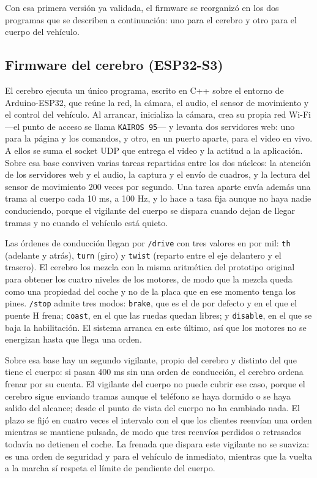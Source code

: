 \documentclass[journal]{IEEEtran}
\begin{document}
Con esa primera versión ya validada, el firmware se reorganizó en los dos programas que se describen a continuación: uno para el cerebro y otro para el cuerpo del vehículo.

\subsection{Firmware del cerebro (ESP32-S3)}
El cerebro ejecuta un único programa, escrito en C++ sobre el entorno de Arduino-ESP32, que reúne la red, la cámara, el audio, el sensor de movimiento y el control del vehículo. Al arrancar, inicializa la cámara, crea su propia red Wi-Fi ---el punto de acceso se llama \texttt{KAIROS 95}--- y levanta dos servidores web: uno para la página y los comandos, y otro, en un puerto aparte, para el video en vivo. A ellos se suma el socket UDP que entrega el video y la actitud a la aplicación. Sobre esa base conviven varias tareas repartidas entre los dos núcleos: la atención de los servidores web y el audio, la captura y el envío de cuadros, y la lectura del sensor de movimiento 200 veces por segundo. Una tarea aparte envía además una trama al cuerpo cada 10 ms, a 100 Hz, y lo hace a tasa fija aunque no haya nadie conduciendo, porque el vigilante del cuerpo se dispara cuando dejan de llegar tramas y no cuando el vehículo está quieto.

Las órdenes de conducción llegan por \texttt{/drive} con tres valores en por mil: \texttt{th} (adelante y atrás), \texttt{turn} (giro) y \texttt{twist} (reparto entre el eje delantero y el trasero). El cerebro los mezcla con la misma aritmética del prototipo original para obtener los cuatro niveles de los motores, de modo que la mezcla queda como una propiedad del coche y no de la placa que en ese momento tenga los pines. \texttt{/stop} admite tres modos: \texttt{brake}, que es el de por defecto y en el que el puente H frena; \texttt{coast}, en el que las ruedas quedan libres; y \texttt{disable}, en el que se baja la habilitación. El sistema arranca en este último, así que los motores no se energizan hasta que llega una orden.

Sobre esa base hay un segundo vigilante, propio del cerebro y distinto del que tiene el cuerpo: si pasan 400 ms sin una orden de conducción, el cerebro ordena frenar por su cuenta. El vigilante del cuerpo no puede cubrir ese caso, porque el cerebro sigue enviando tramas aunque el teléfono se haya dormido o se haya salido del alcance; desde el punto de vista del cuerpo no ha cambiado nada. El plazo se fijó en cuatro veces el intervalo con el que los clientes reenvían una orden mientras se mantiene pulsada, de modo que tres reenvíos perdidos o retrasados todavía no detienen el coche. La frenada que dispara este vigilante no se suaviza: es una orden de seguridad y para el vehículo de inmediato, mientras que la vuelta a la marcha sí respeta el límite de pendiente del cuerpo.
\end{document}
